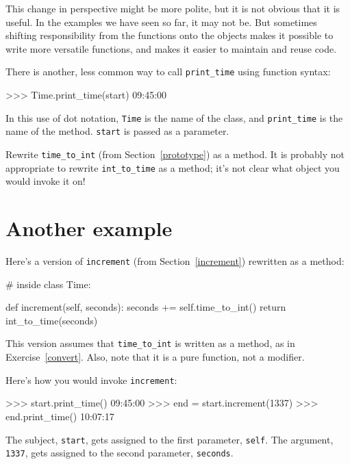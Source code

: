 This change in perspective might be more polite, but it is not obvious
that it is useful.  In the examples we have seen so far, it may not
be.  But sometimes shifting responsibility from the functions onto the
objects makes it possible to write more versatile functions, and makes
it easier to maintain and reuse code.

\begin{remark}
There is another, less common way to call \verb"print_time" using function syntax:



\beforeverb
\begin{pyinterpreter}
>>> Time.print_time(start)
09:45:00
\end{pyinterpreter}
\afterverb
%
In this use of dot notation, {\tt Time} is the name of the class,
and \verb"print_time" is the name of the method.  {\tt start} is
passed as a parameter.
\end{remark}

\begin{exercise}
\label{convert}
Rewrite \verb"time_to_int"
(from Section~\ref{prototype}) as a method.  It is probably not
appropriate to rewrite \verb"int_to_time" as a method; it's not
clear what object you would invoke it on!
\end{exercise}


\section{Another example}


Here's a version of {\tt increment} (from Section~\ref{increment})
rewritten as a method:

\beforeverb
\begin{pycode}
# inside class Time:

    def increment(self, seconds):
        seconds += self.time_to_int()
        return int_to_time(seconds)
\end{pycode}
\afterverb
%
This version assumes that \verb"time_to_int" is written
as a method, as in Exercise~\ref{convert}.  Also, note that
it is a pure function, not a modifier.

Here's how you would invoke {\tt increment}:

\beforeverb
\begin{pyinterpreter}
>>> start.print_time()
09:45:00
>>> end = start.increment(1337)
>>> end.print_time()
10:07:17
\end{pyinterpreter}
\afterverb
%
The subject, {\tt start}, gets assigned to the first parameter,
{\tt self}.  The argument, {\tt 1337}, gets assigned to the
second parameter, {\tt seconds}.

